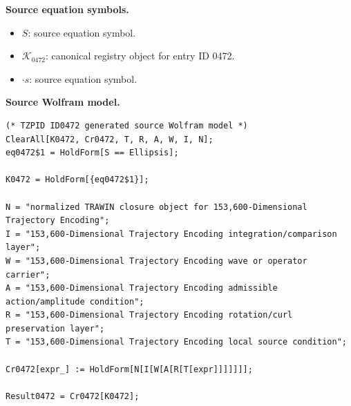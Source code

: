 \begin{minipage}[t]{0.49\linewidth}
\begingroup
\small
\raggedright
\textbf{Source equation symbols.}\par
\begin{itemize}[leftmargin=1.35em,itemsep=1pt,topsep=1pt,parsep=0pt]
    \item $S$: source equation symbol.
    \item $\mathcal{K}_{0472}$: canonical registry object for entry ID 0472.
    \item $\cdot s$: source equation symbol.
\end{itemize}
\endgroup
\end{minipage}\hfill
\begin{minipage}[t]{0.47\linewidth}
\begingroup
\scriptsize
\raggedright
\textbf{Source Wolfram model.}\par
\begin{Verbatim}[fontsize=\tiny,breaklines=true,breakanywhere=true]
(* TZPID ID0472 generated source Wolfram model *)
ClearAll[K0472, Cr0472, T, R, A, W, I, N];
eq0472$1 = HoldForm[S == Ellipsis];

K0472 = HoldForm[{eq0472$1}];

N = "normalized TRAWIN closure object for 153,600-Dimensional Trajectory Encoding";
I = "153,600-Dimensional Trajectory Encoding integration/comparison layer";
W = "153,600-Dimensional Trajectory Encoding wave or operator carrier";
A = "153,600-Dimensional Trajectory Encoding admissible action/amplitude condition";
R = "153,600-Dimensional Trajectory Encoding rotation/curl preservation layer";
T = "153,600-Dimensional Trajectory Encoding local source condition";

Cr0472[expr_] := HoldForm[N[I[W[A[R[T[expr]]]]]]];

Result0472 = Cr0472[K0472];
\end{Verbatim}
\endgroup
\end{minipage}

